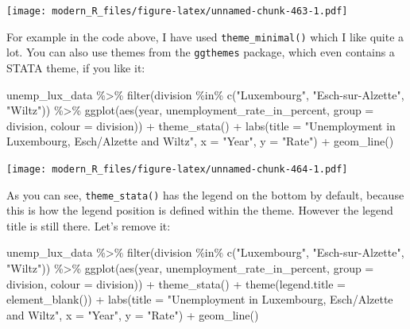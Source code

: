 \documentclass[
]{article}
\newenvironment{Shaded}{\begin{snugshade}}{\end{snugshade}}
\newcommand{\AttributeTok}[1]{\textcolor[rgb]{0.77,0.63,0.00}{#1}}
\newcommand{\FunctionTok}[1]{\textcolor[rgb]{0.00,0.00,0.00}{#1}}
\newcommand{\NormalTok}[1]{#1}
\newcommand{\SpecialCharTok}[1]{\textcolor[rgb]{0.00,0.00,0.00}{#1}}
\newcommand{\StringTok}[1]{\textcolor[rgb]{0.31,0.60,0.02}{#1}}
\begin{document}
\texttt{[image: modern\_R\_files/figure-latex/unnamed-chunk-463-1.pdf]}

For example in the code above, I have used \texttt{theme\_minimal()} which I like quite a lot. You can also
use themes from the \texttt{ggthemes} package, which even contains a STATA theme, if you like it:

\begin{Shaded}
\begin{Highlighting}[]
\NormalTok{unemp\_lux\_data }\SpecialCharTok{\%\textgreater{}\%}
  \FunctionTok{filter}\NormalTok{(division }\SpecialCharTok{\%in\%} \FunctionTok{c}\NormalTok{(}\StringTok{"Luxembourg"}\NormalTok{, }\StringTok{"Esch{-}sur{-}Alzette"}\NormalTok{, }\StringTok{"Wiltz"}\NormalTok{)) }\SpecialCharTok{\%\textgreater{}\%}
  \FunctionTok{ggplot}\NormalTok{(}\FunctionTok{aes}\NormalTok{(year, unemployment\_rate\_in\_percent, }\AttributeTok{group =}\NormalTok{ division, }\AttributeTok{colour =}\NormalTok{ division)) }\SpecialCharTok{+}
  \FunctionTok{theme\_stata}\NormalTok{() }\SpecialCharTok{+}
  \FunctionTok{labs}\NormalTok{(}\AttributeTok{title =} \StringTok{"Unemployment in Luxembourg, Esch/Alzette and Wiltz"}\NormalTok{, }\AttributeTok{x =} \StringTok{"Year"}\NormalTok{, }\AttributeTok{y =} \StringTok{"Rate"}\NormalTok{) }\SpecialCharTok{+}
  \FunctionTok{geom\_line}\NormalTok{()}
\end{Highlighting}
\end{Shaded}

\texttt{[image: modern\_R\_files/figure-latex/unnamed-chunk-464-1.pdf]}

As you can see, \texttt{theme\_stata()} has the legend on the bottom by default, because this is how the
legend position is defined within the theme. However the legend title is still there. Let's remove
it:

\begin{Shaded}
\begin{Highlighting}[]
\NormalTok{unemp\_lux\_data }\SpecialCharTok{\%\textgreater{}\%}
  \FunctionTok{filter}\NormalTok{(division }\SpecialCharTok{\%in\%} \FunctionTok{c}\NormalTok{(}\StringTok{"Luxembourg"}\NormalTok{, }\StringTok{"Esch{-}sur{-}Alzette"}\NormalTok{, }\StringTok{"Wiltz"}\NormalTok{)) }\SpecialCharTok{\%\textgreater{}\%}
  \FunctionTok{ggplot}\NormalTok{(}\FunctionTok{aes}\NormalTok{(year, unemployment\_rate\_in\_percent, }\AttributeTok{group =}\NormalTok{ division, }\AttributeTok{colour =}\NormalTok{ division)) }\SpecialCharTok{+}
  \FunctionTok{theme\_stata}\NormalTok{() }\SpecialCharTok{+}
  \FunctionTok{theme}\NormalTok{(}\AttributeTok{legend.title =} \FunctionTok{element\_blank}\NormalTok{()) }\SpecialCharTok{+}
  \FunctionTok{labs}\NormalTok{(}\AttributeTok{title =} \StringTok{"Unemployment in Luxembourg, Esch/Alzette and Wiltz"}\NormalTok{, }\AttributeTok{x =} \StringTok{"Year"}\NormalTok{, }\AttributeTok{y =} \StringTok{"Rate"}\NormalTok{) }\SpecialCharTok{+}
  \FunctionTok{geom\_line}\NormalTok{()}
\end{Highlighting}
\end{Shaded}
\end{document}
